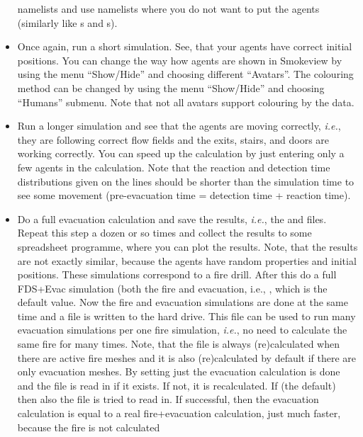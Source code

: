 \documentclass[12pt,a4paper,final,twoside]{stylevk}
\begin{document}
\begin{itemize}
  namelists and use  namelists where you do not want to
  put the agents (similarly like s and s).
%
\item Once again, run a short simulation.  See, that your agents have
  correct initial positions.  You can change the way how agents are
  shown in Smokeview by using the menu ``Show/Hide'' and choosing
  different ``Avatars''.  The colouring method can be changed by using
  the menu ``Show/Hide'' and choosing ``Humans'' submenu.  Note that
  not all avatars support colouring by the data.
%
\item Run a longer simulation and see that the agents are moving
  correctly, \emph{i.e.}, they are following correct flow fields and
  the exits, stairs, and doors are working correctly.  You can speed
  up the calculation by just entering only a few agents in the
  calculation.  Note that the reaction and detection time
  distributions given on the  lines should be shorter than
  the simulation time to see some movement (pre-evacuation time =
  detection time + reaction time).
%
\item Do a full evacuation calculation and save the results,
  \emph{i.e.}, the  and 
  files.  Repeat this step a dozen or so times and collect the results
  to some spreadsheet programme, where you can plot the results.
  Note, that the results are not exactly similar, because the agents
  have random properties and initial positions.  These simulations
  correspond to a fire drill.  After this do a full FDS+Evac
  simulation (both the fire and evacuation, i.e.,
  , which is the default value.  Now
  the fire and evacuation simulations are done at the same time and a
  file  is written to the hard drive.  This file
  can be used to run many evacuation simulations per one fire
  simulation, \emph{i.e.}, no need to calculate the same fire for many
  times.  Note, that the  file is always
  (re)calculated when there are active fire meshes and it is also
  (re)calculated by default if there are only evacuation meshes.  By
  setting  just the evacuation
  calculation is done and the file  is read in
  if it exists.  If not, it is recalculated.  If
   (the default) then also the file
   is tried to read in.  If successful, then the
  evacuation calculation is equal to a real fire+evacuation
  calculation, just much faster, because the fire is not calculated

\end{itemize}
\end{document}
